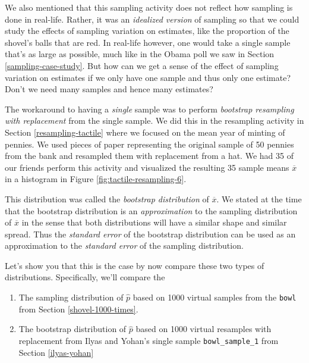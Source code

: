 \documentclass[
]{book}
\providecommand{\tightlist}{%
  \setlength{\itemsep}{0pt}\setlength{\parskip}{0pt}}
\begin{document}
We also mentioned that this sampling activity does not reflect how sampling is done in real-life. Rather, it was an \emph{idealized version} of sampling so that we could study the effects of sampling variation on estimates, like the proportion of the shovel's balls that are red. In real-life however, one would take a single sample that's as large as possible, much like in the Obama poll we saw in Section \ref{sampling-case-study}. But how can we get a sense of the effect of sampling variation on estimates if we only have one sample and thus only one estimate? Don't we need many samples and hence many estimates?

The workaround to having a \emph{single} sample was to perform \emph{bootstrap resampling with replacement} from the single sample. We did this in the resampling activity in Section \ref{resampling-tactile} where we focused on the mean year of minting of pennies. We used pieces of paper representing the original sample of 50 pennies from the bank and resampled them with replacement from a hat. We had 35 of our friends perform this activity and visualized the resulting 35 sample means \(\overline{x}\) in a histogram in Figure \ref{fig:tactile-resampling-6}.

This distribution was called the \emph{bootstrap distribution} of \(\overline{x}\). We stated at the time that the bootstrap distribution is an \emph{approximation} to the sampling distribution of \(\overline{x}\) in the sense that both distributions will have a similar shape and similar spread.  Thus the \emph{standard error} of the bootstrap distribution can be used as an approximation to the \emph{standard error} of the sampling distribution.

Let's show you that this is the case by now compare these two types of distributions. Specifically, we'll compare the

\begin{enumerate}
\def\labelenumi{\arabic{enumi}.}
\tightlist
\item
  The sampling distribution of \(\widehat{p}\) based on 1000 virtual samples from the \texttt{bowl} from Section \ref{shovel-1000-times}.
\item
  The bootstrap distribution of \(\widehat{p}\) based on 1000 virtual resamples with replacement from Ilyas and Yohan's single sample \texttt{bowl\_sample\_1} from Section \ref{ilyas-yohan}
\end{enumerate}
\end{document}
